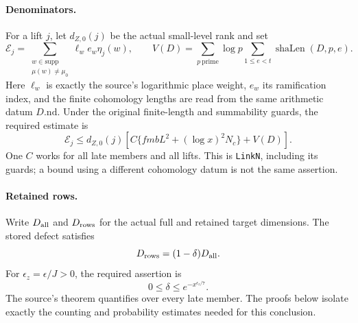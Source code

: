\documentclass[11pt,a4paper]{article}
\numberwithin{equation}{section}
\theoremstyle{remark}\newtheorem{remark}[theorem]{Remark}
\begin{document}
\paragraph{Denominators.}
For a lift $j$, let $d_{Z,0}(j)$ be the actual small-level rank and set
\[
 \mathcal E_j=\sum_{\substack{w\in\mathrm{supp}\\\mu(w)\ne\mu_0}}
       \ell_w e_w\eta_j(w),\qquad
 V(D)=\sum_{p\ \mathrm{prime}}\log p
                 \sum_{1\le e<t}\operatorname{shaLen}(D,\allowbreak{} p,\allowbreak{} e).
\]
Here $\ell_w$ is exactly the source's logarithmic place weight, $e_w$
its ramification index, and the finite cohomology lengths are read from
the same arithmetic datum $D.\mathrm{nd}$. Under the original
finite-length and summability guards, the required estimate is
\begin{equation}\label{eq:gqt-denominator}
 \mathcal E_j\le d_{Z,0}(j)
   \left[C\{fmbL^2+(\log x)^2N_c\}+V(D)\right].
\end{equation}
One $C$ works for all late members and all lifts. This is
\texttt{Link\allowbreak N}, including its guards; a bound using a different
cohomology datum is not the same assertion.

\paragraph{Retained rows.}
Write $D_{\rm all}$ and $D_{\rm rows}$ for the actual full and retained
target dimensions. The stored defect satisfies
\[
 D_{\rm rows}=(1-\delta)D_{\rm all}.
\]
For $\epsilon_z=\epsilon/J>0$, the required assertion is
\begin{equation}\label{eq:gqt-defect}
                  0\le\delta\le e^{-x^{\epsilon_z/7}}.
\end{equation}
The source's theorem quantifies over every late member. The proofs
below isolate exactly the counting and probability estimates needed
for this conclusion.
\end{document}
